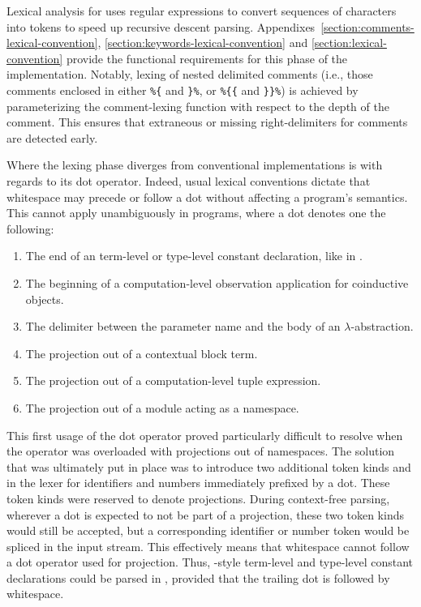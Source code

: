 Lexical analysis for \Beluga uses regular expressions to convert sequences of characters into tokens to speed up recursive descent parsing.
Appendixes~\ref{section:comments-lexical-convention}, \ref{section:keywords-lexical-convention} and \ref{section:lexical-convention} provide the functional requirements for this phase of the implementation.
Notably, lexing of nested delimited comments (i.e., those comments enclosed in either \verb|%{| and \verb|}%|, or \verb|%{{| and \verb|}}%|) is achieved by parameterizing the comment-lexing function with respect to the depth of the comment.
This ensures that extraneous or missing right-delimiters for comments are detected early.

Where the lexing phase diverges from conventional implementations is with regards to its dot operator.
Indeed, usual lexical conventions dictate that whitespace may precede or follow a dot without affecting a program's semantics.
This cannot apply unambiguously in \Beluga programs, where a dot denotes one the following:
\begin{enumerate}
\item
The end of an \LF term-level or type-level constant declaration, like in \Twelf.
\item
The beginning of a computation-level observation application for coinductive objects.
\item
The delimiter between the parameter name and the body of an \LF $\lambda$-abstraction.
\item
The projection out of a contextual \LF block term.
\item
The projection out of a computation-level tuple expression.
\item
The projection out of a module acting as a namespace.
\end{enumerate}

This first usage of the dot operator proved particularly difficult to resolve when the operator was overloaded with projections out of namespaces.
The solution that was ultimately put in place was to introduce two additional token kinds  and  in the lexer for identifiers and numbers immediately prefixed by a dot.
These token kinds were reserved to denote projections.
During context-free parsing, wherever a dot is expected to not be part of a projection, these two token kinds would still be accepted, but a corresponding identifier or number token would be spliced in the input stream.
This effectively means that whitespace cannot follow a dot operator used for projection.
Thus, \Twelf-style \LF term-level and type-level constant declarations could be parsed in \Beluga, provided that the trailing dot is followed by whitespace.

